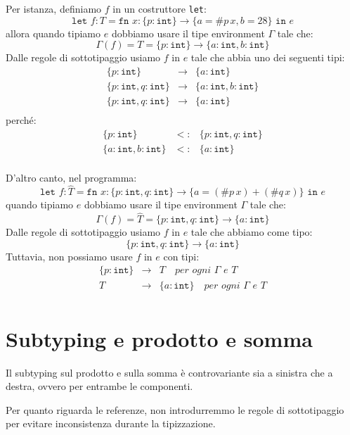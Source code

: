Per istanza, definiamo $f$ in un costruttore \texttt{let}:
\[
    \texttt{let } f : T = \texttt{fn } x :
    \{ p : \texttt{int} \} \rightarrow 
    \{ a = \# p\, x , b = 28\} \texttt{ in } e
\]
allora quando tipiamo $e$ dobbiamo usare il tipe environment $\Gamma$ 
tale che:
\[
    \Gamma (f) = T = \{ p : \texttt{int} \} \rightarrow
    \{ a : \texttt{int}, b : \texttt{int} \}
\]
Dalle regole di sottotipaggio usiamo $f$ in $e$ tale che abbia uno 
dei seguenti tipi:
\[
\begin{array}{lll}
    \{ p : \texttt{int} \} & \rightarrow & \{ a : \texttt{int} \}\\
    \{ p : \texttt{int}, q: \texttt{int} \} & \rightarrow & \{ a : \texttt{int}, b : \texttt{int} \}\\
    \{ p : \texttt{int}, q: \texttt{int}\} & \rightarrow & \{ a : \texttt{int}\}\\
\end{array}
\]
perché:
\[
  \begin{array}{lll}
    \{ p : \texttt{int} \} & <: & \{ p : \texttt{int}, q: \texttt{int} \}\\
    \{ a : \texttt{int}, b : \texttt{int} \} & <: & \{ a : \texttt{int} \}\\
  \end{array}  
\]

D'altro canto, nel programma:
\[
    \texttt{let } f : \hat{T} = \texttt{fn } x :
    \{ p : \texttt{int}, q: \texttt{int} \} \rightarrow 
    \{ a = (\# p\,x) + (\# q\,x)\} \texttt{ in } e
\]
quando tipiamo $e$ dobbiamo usare il tipe environment $\Gamma$ tale che:
\[
  \Gamma(f) = \hat{T} = \{ p : \texttt{int}, q: \texttt{int} \}
  \rightarrow \{ a : \texttt{int} \}  
\]
Dalle regole di sottotipaggio usiamo $f$ in $e$ tale che abbiamo come 
tipo:
\[
    \{ p : \texttt{int}, q: \texttt{int} \} \rightarrow
    \{ a : \texttt{int} \}
\]
Tuttavia, non possiamo usare $f$ in $e$ con tipi:
\[
  \begin{array}{lll}
    \{ p : \texttt{int} \} & \rightarrow & T \quad \textit{per ogni } \Gamma \textit{ e } T\\
    T & \rightarrow & \{ a : \texttt{int} \} \quad \textit{per ogni } \Gamma \textit{ e } T\\
  \end{array}  
\]
\section{Subtyping e prodotto e somma}
Il subtyping sul prodotto e sulla somma è controvariante 
sia a sinistra che a destra, ovvero per entrambe le componenti.
\begin{prooftree}
\end{prooftree}
\begin{prooftree}
\end{prooftree}
Per quanto riguarda le referenze, non introdurremmo le regole di sottotipaggio 
per evitare inconsistenza durante la tipizzazione.

